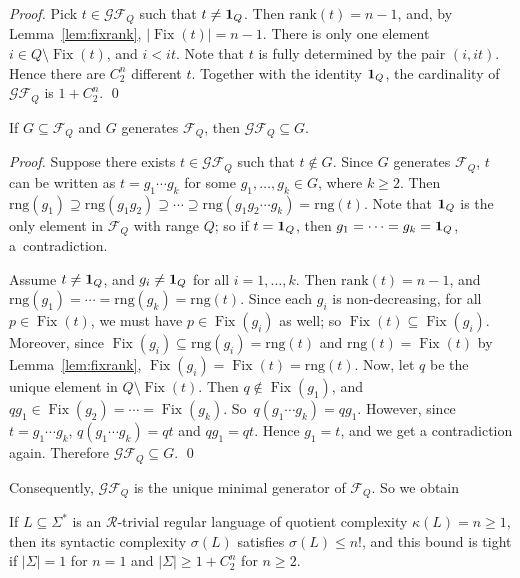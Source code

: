 \documentclass{llncs}
\renewcommand{\le}{\leqslant}
\renewcommand{\ge}{\geqslant}
\newcommand{\Sig}{\Sigma}
\newcommand{\trng}{\mathrm{rng}}
\newcommand{\trank}{\mathrm{rank}}
\newcommand{\tid}{\mbox{{\bf 1}}}
\newcommand{\cF}{{\mathcal F}}
\newcommand{\cG}{{\mathcal G}}
\newcommand{\gR}{{\mathcal R}}
\DeclareMathOperator{\Fix}{Fix}
\begin{document}
\begin{proof} 
Pick $t \in \cG\cF_Q$ such that $t \neq \tid_Q$. Then $\trank(t) = n-1$, and, by Lemma~\ref{lem:fixrank}, $|\Fix(t)| = n-1$. There is only one element $i \in Q \setminus \Fix(t)$, and $i < it$. Note that $t$ is fully determined by the pair $(i, it)$. Hence there are $C^n_2$ different $t$. Together with the identity $\tid_Q$, the cardinality of $\cG\cF_Q$ is $1 + C^n_2$. \qed
\end{proof}

\begin{lemma}\label{lem:minGF} 
If $G \subseteq \cF_Q$ and $G$ generates $\cF_Q$, then $\cG\cF_Q \subseteq G$. 
\end{lemma}

\begin{proof}
Suppose there exists $t \in \cG\cF_Q$ such that $t \not\in G$. Since $G$ generates $\cF_Q$, $t$ can be written as $t = g_1 \cdots g_k$ for some $g_1,\ldots,g_k \in G$, where $k \ge 2$. Then $\trng(g_1) \supseteq \trng(g_1g_2) \supseteq \cdots \supseteq \trng(g_1g_2 \cdots g_k) = \trng(t)$. Note that $\tid_Q$ is the only element in $\cF_Q$ with range $Q$; so if $t = \tid_Q$, then $g_1 = \cdots = g_k = \tid_Q$, a~contradiction. 

Assume $t \neq \tid_Q$, and $g_i \neq \tid_Q$ for all $i=1,\ldots,k$. Then $\trank(t) = n-1$, and $\trng(g_1) = \cdots = \trng(g_k) = \trng(t)$. Since each $g_i$ is non-decreasing, for all $p \in \Fix(t)$, we must have $p \in \Fix(g_i)$ as well; so $\Fix(t) \subseteq \Fix(g_i)$. Moreover, since $\Fix(g_i) \subseteq \trng(g_i) = \trng(t)$ and $\trng(t) = \Fix(t)$ by Lemma~\ref{lem:fixrank}, $\Fix(g_i) = \Fix(t) = \trng(t)$. Now, let $q$ be the unique element in $Q \setminus \Fix(t)$. Then $q \not\in \Fix(g_1)$, and $qg_1 \in \Fix(g_2) = \cdots = \Fix(g_k)$. So~$q(g_1 \cdots g_k) = qg_1$. However, since $t = g_1 \cdots g_k$, $q(g_1 \cdots g_k) = qt$ and $qg_1 = qt$. Hence $g_1 = t$, and we get a contradiction again. Therefore $\cG\cF_Q \subseteq G$. \qed
\end{proof}

Consequently, $\cG\cF_Q$ is the unique minimal generator of $\cF_Q$. So we obtain  

\begin{theorem}\label{thm:Rtrivial}
If $L \subseteq \Sig^*$ is an $\gR$-trivial regular language of quotient complexity $\kappa(L) = n \ge 1$, then its syntactic complexity $\sigma(L)$ satisfies $\sigma(L) \le n!$, and this bound is tight if $|\Sig| = 1$ for $n = 1$ and $|\Sig| \ge 1 + C^n_2$ for $n \ge 2$.  
\end{theorem}
\end{document}

